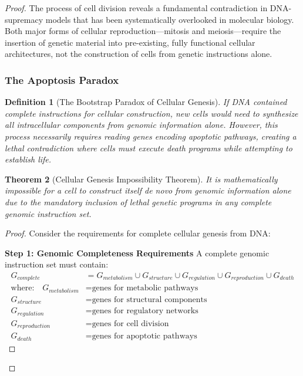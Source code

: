 \documentclass[12pt,a4paper]{article}
\newtheorem{theorem}{Theorem}[section]
\newtheorem{definition}[theorem]{Definition}
\begin{document}
\begin{proof}
The process of cell division reveals a fundamental contradiction in DNA-supremacy models that has been systematically overlooked in molecular biology. Both major forms of cellular reproduction—mitosis and meiosis—require the insertion of genetic material into pre-existing, fully functional cellular architectures, not the construction of cells from genetic instructions alone.

\subsubsection{The Apoptosis Paradox}

\begin{definition}[The Bootstrap Paradox of Cellular Genesis]
If DNA contained complete instructions for cellular construction, new cells would need to synthesize all intracellular components from genomic information alone. However, this process necessarily requires reading genes encoding apoptotic pathways, creating a lethal contradiction where cells must execute death programs while attempting to establish life.
\end{definition}

\begin{theorem}[Cellular Genesis Impossibility Theorem]
It is mathematically impossible for a cell to construct itself de novo from genomic information alone due to the mandatory inclusion of lethal genetic programs in any complete genomic instruction set.
\end{theorem}

\begin{proof}
Consider the requirements for complete cellular genesis from DNA:

\textbf{Step 1: Genomic Completeness Requirements}
A complete genomic instruction set must contain:
\begin{align}
G_{complete} &= G_{metabolism} \cup G_{structure} \cup G_{regulation} \cup G_{reproduction} \cup G_{death} \\
\text{where:} \quad G_{metabolism} &= \text{genes for metabolic pathways} \\
G_{structure} &= \text{genes for structural components} \\
G_{regulation} &= \text{genes for regulatory networks} \\
G_{reproduction} &= \text{genes for cell division} \\
G_{death} &= \text{genes for apoptotic pathways}
\end{align}


\end{proof}
\end{proof}
\end{document}
